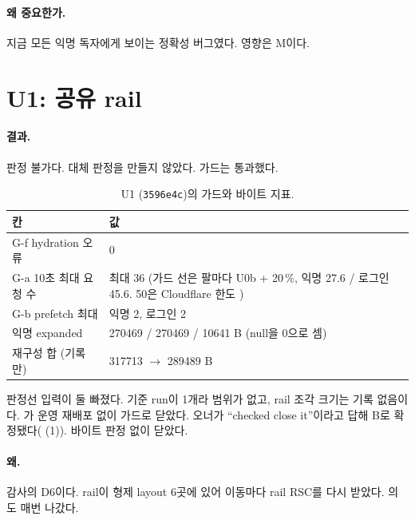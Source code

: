 \paragraph{왜 중요한가.}
지금 모든 익명 독자에게 보이는 정확성 버그였다. 영향은 M이다.

\section{U1: 공유 rail}\label{sec:re-u1}

\paragraph{결과.}
판정 불가다. 대체 판정을 만들지 않았다. 가드는 통과했다.
\begin{table}[H]
  \caption{U1 (\texttt{3596e4c})의 가드와 바이트 지표.}
  \label{tab:re-u1}
  \centering\small
  \begin{tabularx}{\linewidth}{@{}Y L{4.4cm}@{}}
    \toprule
    칸 & 값 \\
    \midrule
    G-f hydration 오류 & 0 \\
    \midrule
    G-a 10초 최대 요청 수 & 최대 36 (가드 선은 팔마다 U0b + 20\,\%, 익명 27.6 / 로그인 45.6. 50은 Cloudflare 한도 ) \\
    \midrule
    G-b prefetch 최대 & 익명 2, 로그인 2 \\
    \midrule
    익명 expanded  & 270469 / 270469 / 10641 B (null을 0으로 셈) \\
    \midrule
    재구성 합 (기록만) & 317713 $\to$ 289489 B \\
    \bottomrule
  \end{tabularx}
\end{table}
판정선 입력이 둘 빠졌다. 기준 run이 1개라 범위가 없고, rail 조각 크기는 기록 없음이다.
가 운영 재배포 없이 가드로 닫았다. 오너가 ``checked close it''이라고 답해 B로 확정됐다( (1)). 바이트 판정 없이 닫았다.

\paragraph{왜.}
감사의 D6이다. rail이 형제 layout 6곳에 있어 이동마다 rail RSC를 다시 받았다.
의 도 매번 나갔다.

